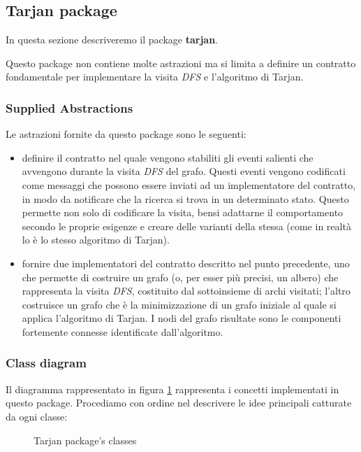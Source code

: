 \subsection{Tarjan package}

In questa sezione descriveremo il package \textbf{tarjan}.

Questo package non contiene molte astrazioni ma si limita a definire
un contratto fondamentale per implementare la visita \emph{DFS} e
l'algoritmo di Tarjan.

\subsubsection*{Supplied Abstractions}

Le astrazioni fornite da questo package sono le seguenti:
\begin{itemize}
\item definire il contratto nel quale vengono stabiliti gli eventi
  salienti che avvengono durante la visita \emph{DFS} del
  grafo. Questi eventi vengono codificati come messaggi che possono
  essere inviati ad un implementatore del contratto, in modo da
  notificare che la ricerca si trova in un determinato stato. Questo
  permette non solo di codificare la visita, bensi adattarne il
  comportamento secondo le proprie esigenze e creare delle varianti
  della stessa (come in realt\`a lo \`e lo stesso algoritmo di
  Tarjan).
\item fornire due implementatori del contratto descritto nel punto
  precedente, uno che permette di costruire un grafo (o, per esser
  pi\`u precisi, un albero) che rappresenta la visita \emph{DFS},
  costituito dal sottoinsieme di archi visitati; l'altro costruisce un
  grafo che \`e la minimizzazione di un grafo iniziale al quale si
  applica l'algoritmo di Tarjan. I nodi del grafo risultate sono le
  componenti fortemente connesse identificate dall'algoritmo.
\end{itemize}

\subsubsection*{Class diagram}
Il diagramma rappresentato in figura \ref{fig:tarjan-package-classes}
rappresenta i concetti implementati in questo package. Procediamo con
ordine nel descrivere le idee principali catturate da ogni classe:

\begin{figure}
  \centering
  \caption{Tarjan package's classes}
  \label{fig:tarjan-package-classes}
\end{figure}

